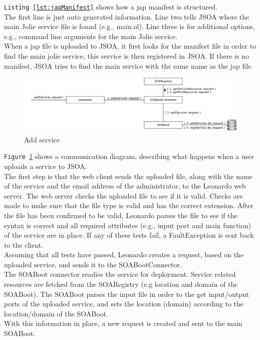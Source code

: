 \documentclass[12pt,a4paper]{article}
\begin{document}
\texttt{Listing \ref{lst:japManifest}} shows how a jap manifest is structured.\\
The first line is just auto generated information. Line two tells JSOA where the main Jolie service file is found (e.g., main.ol). Line three is for additional options, e.g., command line arguments for the main Jolie service.\\
When a jap file is uploaded to JSOA, it first looks for the manifest file in order to find the main jolie service, this service is then registered in JSOA. If there is no manifest, JSOA tries to find the main service with the same name as the jap file.

\begin{figure}[h!]
  \centering
    \includegraphics[width=1.0\textwidth]{../figures/jsoa_add_service_communication_diagram.png}
  \caption{Add service}
  \label{fig:jsoaAddService}
\end{figure}

\texttt{Figure \ref{fig:jsoaAddService}} shows a communication diagram, describing what happens when a user uploads a service to JSOA. \\
The first step is that the web client sends the uploaded file, along with the name of the service and the email address of the administrator, to the Leonardo web server. The web server checks the uploaded file to see if it is valid. Checks are made to make sure that the file type is valid and has the correct extension. After the file has been confirmed to be valid, Leonardo parses the file to see if the syntax is correct and all required attributes (e.g., input port and main function) of the service are in place. If any of these tests fail, a FaultException is sent back to the client. \\
Assuming that all tests have passed, Leonardo creates a request, based on the uploaded service, and sends it to the SOABootConnector. \\

The SOABoot connector readies the service for deployment. Service related resources are fetched from the SOARegistry (e.g location and domain of the SOABoot). The SOABoot parses the input file in order
to the get input/output ports of the uploaded service, and sets the location (domain) according to the location/domain of the SOABoot. \\
With this information in place, a new request is created and sent to the main SOABoot. \\
\end{document}
